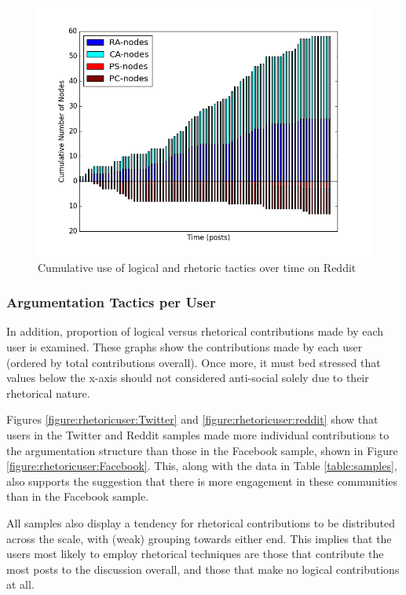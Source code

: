\begin{figure}
\centering
\includegraphics[scale=\scaleResults]{./figures/rhetoric_over_time/reddit.png}
\caption{Cumulative use of logical and rhetoric tactics over time on Reddit}
\label{figure:rhetorictime:reddit}
\end{figure}


\subsubsection{Argumentation Tactics per User}
In addition, proportion of logical versus rhetorical contributions made by each user is examined. These graphs show the contributions made by each user (ordered by total contributions overall). Once more, it must bed stressed that values below the x-axis should not considered anti-social solely due to their rhetorical nature.

Figures \ref{figure:rhetoricuser:Twitter} and \ref{figure:rhetoricuser:reddit} show that users in the Twitter and Reddit samples made more individual contributions to the argumentation structure than those in the Facebook sample, shown in Figure \ref{figure:rhetoricuser:Facebook}. This, along with the data in Table \ref{table:samples}, also supports the suggestion that there is more engagement in these communities than in the Facebook sample.

All samples also display a tendency for rhetorical contributions to be distributed across the scale, with (weak) grouping towards either end. 
This implies that the users most likely to employ rhetorical techniques are those that contribute the most posts to the discussion overall, and those that make no logical contributions at all.

